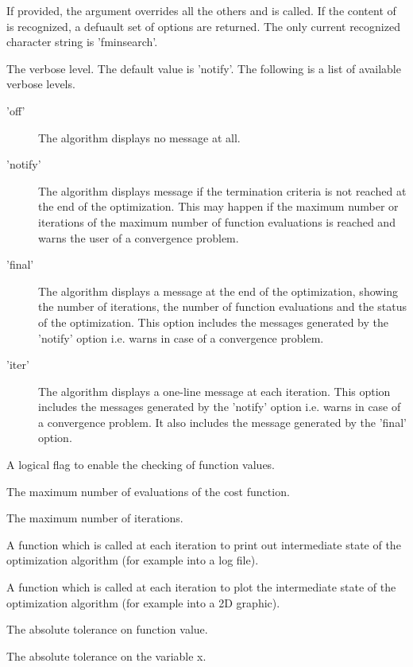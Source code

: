 \begin{Arguments}
\begin{ldescription}
\item[\code{method}] If provided, the  argument overrides all the
others and  is called. If the content of 
is recognized, a defuault set of options are returned. The only current
recognized character string is 'fminsearch'.
\item[\code{Display}] The verbose level. The default value is 'notify'. The following
is a list of available verbose levels.\begin{description}

\item['off'] The algorithm displays no message at all.
\item['notify'] The algorithm displays message if the termination criteria
is not reached at the end of the optimization. This may happen if the
maximum number or iterations of the maximum number of function
evaluations is reached and warns the user of a convergence problem.
\item['final'] The algorithm displays a message at the end of the
optimization, showing the number of iterations, the number of function
evaluations and the status of the optimization. This option includes the
messages generated by the 'notify' option i.e. warns in case of a
convergence problem.
\item['iter'] The algorithm displays a one-line message at each iteration.
This option includes the messages generated by the 'notify' option i.e.
warns in case of a convergence problem. It also includes the message
generated by the 'final' option.

\end{description}


\item[\code{FunValCheck}] A logical flag to enable the checking of function values.
\item[\code{MaxFunEvals}] The maximum number of evaluations of the cost function.
\item[\code{MaxIter}] The maximum number of iterations.
\item[\code{OutputFcn}] A function which is called at each iteration to print out
intermediate state of the optimization algorithm (for example into a log
file).
\item[\code{PlotFcns}] A function which is called at each iteration to plot the
intermediate state of the optimization algorithm (for example into a 2D
graphic).
\item[\code{TolFun}] The absolute tolerance on function value.
\item[\code{TolX}] The absolute tolerance on the variable x.
\end{ldescription}
\end{Arguments}

